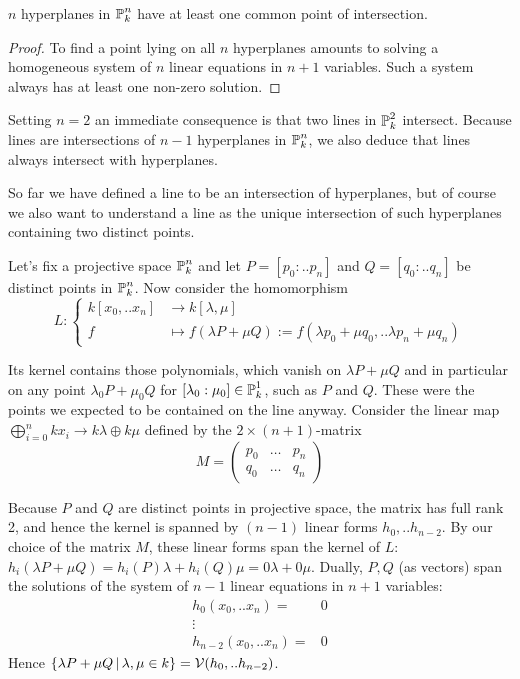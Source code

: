 \begin{proposition} $n$ hyperplanes in $\operatorname{\mathbb P}^n_k$ have at least one common point of intersection.
\end{proposition}
\begin{proof}
To find a point lying on all $n$ hyperplanes amounts to solving a homogeneous system of $n$ linear equations in $n+1$ variables.
Such a system always has at least one non-zero solution.
\end{proof}

Setting $n=2$ an immediate consequence is that two lines in $\operatorname{\mathbb P}^2_k$ intersect.
Because lines are intersections of $n-1$ hyperplanes in $\operatorname{\mathbb P}^n_k$, we also deduce that lines always intersect with hyperplanes.


So far we have defined a line to be an intersection of hyperplanes, but of course we also want to understand a line as the unique intersection of such hyperplanes containing two distinct points.

Let's fix a projective space $\operatorname{\mathbb P}^n_k$ and let $P=[p_0:..p_n]$ and $Q=[q_0:..q_n]$ be distinct points in $\operatorname{\mathbb P}^n_k$. Now consider the homomorphism
\begin{equation}
L : \begin{cases}
k[x_0,..x_n] &\to k[\lambda,\mu] \\
f &\mapsto f(\lambda P + \mu Q) := f(\lambda p_0 + \mu q_0, .. \lambda p_n + \mu q_n)
\end{cases}
\end{equation}

Its kernel contains those polynomials, which vanish on $\lambda P + \mu Q$ and in particular on any point $\lambda_0 P + \mu_0 Q$ for $[\lambda_0:\mu_0] \in \operatorname{\mathbb P}^1_k$, such as $P$ and $Q$.
These were the points we expected to be contained on the line anyway.
Consider the linear map $\bigoplus_{i=0}^n kx_i \to k\lambda \oplus k\mu$ defined by the $2\times (n+1)$-matrix
\begin{equation}
M=
\begin{pmatrix}
p_0 & \ldots & p_n \\
q_0 & \ldots & q_n
\end{pmatrix}
\end{equation}

Because $P$ and $Q$ are distinct points in projective space, the matrix has full rank 2, and hence the kernel is spanned by $(n-1)$ linear forms $h_0,..h_{n-2}$.
By our choice of the matrix $M$, these linear forms span the kernel of $L$: $h_i(\lambda P + \mu Q) = h_i(P) \lambda + h_i(Q)\mu = 0 \lambda + 0 \mu$.
Dually, $P,Q$ (as vectors) span the solutions of the system of $n-1$ linear equations in $n+1$ variables:
\begin{align}
h_0(x_0,..x_n) =& 0 \\
\vdots& \\
h_{n-2}(x_0,..x_n) =& 0
\end{align}
Hence $\left\lbrace\lambda P + \mu Q\,|\, \lambda, \mu \in k\right\rbrace = \operatorname{\mathcal V}(h_0,..h_{n-2})$.

